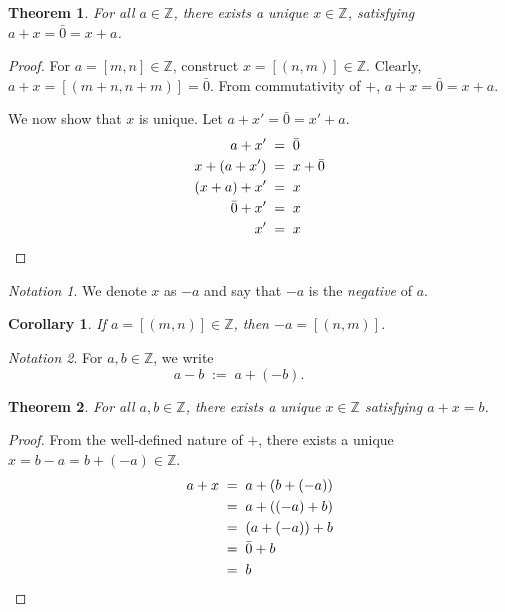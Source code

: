 \documentclass[10pt]{article}
\newtheorem{theorem}{Theorem}[section]
\newtheorem{corollary}{Corollary}[theorem]
\theoremstyle{definition}
\theoremstyle{remark}
\newtheorem*{notation}{Notation}
\begin{document}
        \begin{theorem}
                        For all $a \in \mathbb{Z}$, there exists a unique $x \in \mathbb{Z}$, satisfying $a + x = \bar{0} = x + a$.
        \end{theorem}
        \begin{proof}
                For $a = [m, n] \in \mathbb{Z}$, construct $x = [(n, m)] \in \mathbb{Z}$.
                Clearly, $a + x = [(m + n, n + m)] = \bar{0}$.
                From commutativity of $+$, $a + x = \bar{0} = x + a$.

                We now show that $x$ is unique. Let $a + x' = \bar{0} = x' + a$.
                \begin{align*}
                        a + x' \;&=\; \bar{0} \\
                        x + (a + x') \;&=\; x + \bar{0} \\
                        (x + a) + x' \;&=\; x \\
                        \bar{0} + x' \;&=\; x \\
                        x' \;&=\; x     \qedhere
                \end{align*}
        \end{proof}
        \begin{notation}
                We denote $x$ as $-a$ and say that $-a$ is the \textit{negative} of $a$.
        \end{notation}
        \begin{corollary}
                If $a = [(m, n)] \in \mathbb{Z}$, then $-a = [(n, m)]$.
        \end{corollary}
        \begin{notation}
                For $a, b \in \mathbb{Z}$, we write
                \[
                a - b \;:=\; a + (-b).\quad\quad\quad
                \]
        \end{notation}

        \begin{theorem}
                        For all $a, b \in \mathbb{Z}$, there exists a unique $x \in \mathbb{Z}$ satisfying $a + x = b$.
        \end{theorem}
        \begin{proof}
                From the well-defined nature of $+$, there exists a unique $x = b - a = b + (-a) \in \mathbb{Z}$.
                \begin{align*}
                        a + x \;&=\; a + (b + (-a)) \\
                                \;&=\; a + ((-a) + b) \\
                                \;&=\; (a + (-a)) + b \\
                                \;&=\; \bar{0} + b \\
                                \;&=\; b \qedhere
                \end{align*}
        \end{proof}
\end{document}
